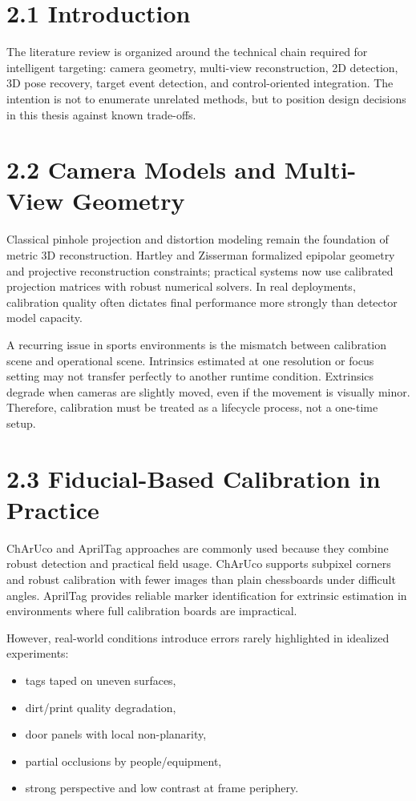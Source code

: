 \section{2.1 Introduction}
The literature review is organized around the technical chain required for intelligent targeting: camera geometry, multi-view reconstruction, 2D detection, 3D pose recovery, target event detection, and control-oriented integration. The intention is not to enumerate unrelated methods, but to position design decisions in this thesis against known trade-offs.

\section{2.2 Camera Models and Multi-View Geometry}
Classical pinhole projection and distortion modeling remain the foundation of metric 3D reconstruction. Hartley and Zisserman formalized epipolar geometry and projective reconstruction constraints; practical systems now use calibrated projection matrices with robust numerical solvers. In real deployments, calibration quality often dictates final performance more strongly than detector model capacity.

A recurring issue in sports environments is the mismatch between calibration scene and operational scene. Intrinsics estimated at one resolution or focus setting may not transfer perfectly to another runtime condition. Extrinsics degrade when cameras are slightly moved, even if the movement is visually minor. Therefore, calibration must be treated as a lifecycle process, not a one-time setup.

\section{2.3 Fiducial-Based Calibration in Practice}
ChArUco and AprilTag approaches are commonly used because they combine robust detection and practical field usage. ChArUco supports subpixel corners and robust calibration with fewer images than plain chessboards under difficult angles. AprilTag provides reliable marker identification for extrinsic estimation in environments where full calibration boards are impractical.

However, real-world conditions introduce errors rarely highlighted in idealized experiments:
\begin{itemize}
  \item tags taped on uneven surfaces,
  \item dirt/print quality degradation,
  \item door panels with local non-planarity,
  \item partial occlusions by people/equipment,
  \item strong perspective and low contrast at frame periphery.
\end{itemize}

